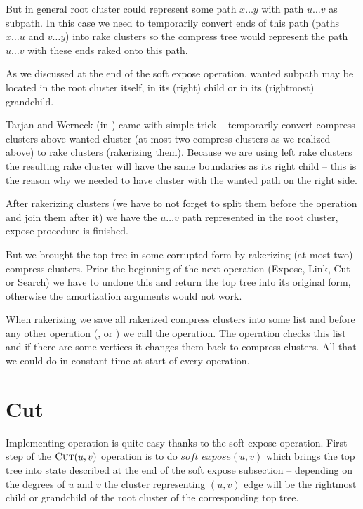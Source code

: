 But in general root cluster could represent some path $x\dots y$ with path $u\dots v$
as subpath. In this case we need to temporarily convert ends of this path (paths
$x\dots u$ and $v\dots y$) into rake clusters so the compress tree would represent the
path $u\dots v$ with these ends raked onto this path.

As we discussed at the end of the soft expose operation, wanted subpath may be
located in the root cluster itself, in its (right) child or in its (rightmost)
grandchild.

Tarjan and Werneck (in \cite{SelfAdjustingTT}) came with simple trick -- temporarily
convert compress clusters above wanted cluster (at most two compress clusters as
we realized above) to rake clusters ({\I rakerizing} them). Because we are using
left rake clusters the resulting rake cluster will have the same boundaries as
its right child -- this is the reason why we needed to have cluster with the
wanted path on the right side.

After rakerizing clusters (we have to not forget to split them before the
operation and join them after it) we have the $u\dots v$ path represented in
the root cluster, expose procedure is finished.

But we brought the top tree in some corrupted form by rakerizing (at most two)
compress clusters. Prior the beginning of the next operation (Expose, Link, Cut
or Search) we have to undone this and return the top tree into its original
form, otherwise the amortization arguments would not work.

When rakerizing we save all rakerized compress clusters into some list and
before any other operation (\Cut, \Link or \Expose) we call the \Restore{} operation.
The \Restore{} operation checks this list and if there are some vertices it changes
them back to compress clusters. All that we could do in constant time at start
of every operation.

\section{Cut}

Implementing \Cut{} operation is quite easy thanks to the soft expose operation.
First step of the $\hbox{\sc Cut}(u,v)$ operation is to do $soft\_expose(u,v)$ which brings
the top tree into state described at the end of the soft expose subsection
-- depending on the degrees of $u$ and $v$ the cluster representing
$(u,v)$ edge will be the rightmost child or grandchild of the root cluster of the
corresponding top tree.

